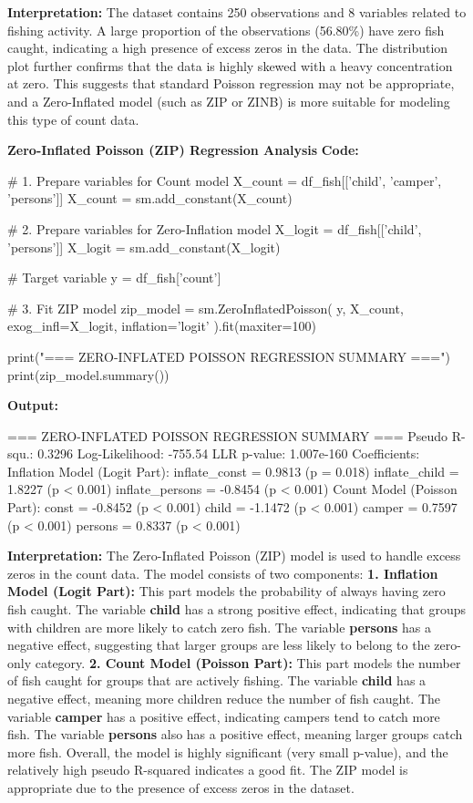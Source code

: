 \documentclass[12pt,a4paper]{article}
\begin{document}
\textbf{Interpretation:}
The dataset contains 250 observations and 8 variables related to fishing activity.
A large proportion of the observations (56.80\%) have zero fish caught, indicating a high presence of excess zeros in the data.
The distribution plot further confirms that the data is highly skewed with a heavy concentration at zero.
This suggests that standard Poisson regression may not be appropriate, and a Zero-Inflated model (such as ZIP or ZINB) is more suitable for modeling this type of count data.

\textbf{Zero-Inflated Poisson (ZIP) Regression Analysis}
\textbf{Code:}
\begin{codebox}
# 1. Prepare variables for Count model
X_count = df_fish[['child', 'camper', 'persons']]
X_count = sm.add_constant(X_count)

# 2. Prepare variables for Zero-Inflation model
X_logit = df_fish[['child', 'persons']]
X_logit = sm.add_constant(X_logit)

# Target variable
y = df_fish['count']

# 3. Fit ZIP model
zip_model = sm.ZeroInflatedPoisson(
    y, X_count,
    exog_infl=X_logit,
    inflation='logit'
).fit(maxiter=100)

print("=== ZERO-INFLATED POISSON REGRESSION SUMMARY ===")
print(zip_model.summary())
\end{codebox}

\textbf{Output:}
\begin{codebox}
=== ZERO-INFLATED POISSON REGRESSION SUMMARY ===
Pseudo R-squ.: 0.3296
Log-Likelihood: -755.54
LLR p-value: 1.007e-160
Coefficients:
Inflation Model (Logit Part):
inflate_const = 0.9813 (p = 0.018)
inflate_child = 1.8227 (p < 0.001)
inflate_persons = -0.8454 (p < 0.001)
Count Model (Poisson Part):
const = -0.8452 (p < 0.001)
child = -1.1472 (p < 0.001)
camper = 0.7597 (p < 0.001)
persons = 0.8337 (p < 0.001)
\end{codebox}

\textbf{Interpretation:}
The Zero-Inflated Poisson (ZIP) model is used to handle excess zeros in the count data.
The model consists of two components:
\textbf{1. Inflation Model (Logit Part):} This part models the probability of always having zero fish caught.
The variable \textbf{child} has a strong positive effect, indicating that groups with children are more likely to catch zero fish.
The variable \textbf{persons} has a negative effect, suggesting that larger groups are less likely to belong to the zero-only category.
\textbf{2. Count Model (Poisson Part):} This part models the number of fish caught for groups that are actively fishing.
The variable \textbf{child} has a negative effect, meaning more children reduce the number of fish caught.
The variable \textbf{camper} has a positive effect, indicating campers tend to catch more fish.
The variable \textbf{persons} also has a positive effect, meaning larger groups catch more fish.
Overall, the model is highly significant (very small p-value), and the relatively high pseudo R-squared indicates a good fit.
The ZIP model is appropriate due to the presence of excess zeros in the dataset.
\end{document}
